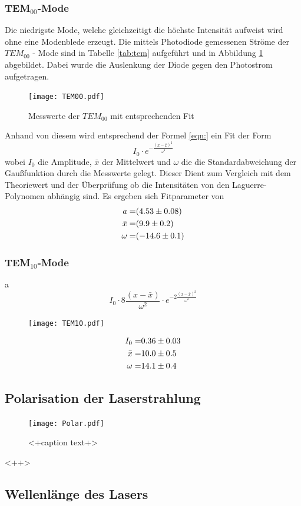 \subsubsection{TEM$_\text{00}$-Mode}
Die niedrigste Mode, welche gleichzeitigt die höchste Intensität aufweist wird ohne eine Modenblede erzeugt. Die mittels Photodiode gemessenen Ströme der $TEM_{00}$ - Mode sind in Tabelle \ref{tab:tem} aufgeführt und in Abbildung \ref{fig:TEM00} abgebildet. Dabei wurde die Auslenkung der Diode gegen den Photostrom aufgetragen.
\begin{figure}
  \centering
  \texttt{[image: TEM00.pdf]}
  \caption{Messwerte der $TEM_{00}$ mit entsprechenden Fit}
  \label{fig:TEM00}
\end{figure}

Anhand von diesem wird entsprechend der Formel \ref{eqn:} ein Fit der Form 
\begin{equation}
  I_0 \cdot e^{- \frac{(x-\bar{x})^2}{\omega^2} }
  \label{eqn:gausian}
\end{equation}
wobei $I_0$ die Amplitude, $\bar{x}$ der Mittelwert und $\omega$ die die Standardabweichung der Gaußfunktion durch die Messwerte gelegt. Dieser Dient zum Vergleich mit dem Theoriewert und der Überprüfung ob die Intensitäten von den Laguerre-Polynomen abhängig sind. Es ergeben sich Fitparameter von 
\begin{eqnarray}
  a =& (\num{4.53 +- 0.08})	\\
  \bar{x} =& (\num{9.9 +- 0.2})	\\
  \omega =& (\num{-14.6 +-0.1})	
  \label{eqn:coef}
\end{eqnarray}
\subsubsection{TEM$_\text{10}$-Mode}
a
\begin{equation}
  I_0 \cdot 8 \frac{\left( x - \bar{x} \right)}{\omega^2} \cdot e^{-2 \frac{\left( x - \bar{x} \right)^2}{\omega^2}}
  \label{eqn:TEM10}
\end{equation}

\begin{figure}
  \centering
  \texttt{[image: TEM10.pdf]}
  \caption{}
  \label{fig:<+label+>}
\end{figure}

\begin{eqnarray}
  I_0 =& \num{0.36 +- 0.03}	\\
  \bar{x} =& \num{10.0 +- 0.5} \\
  \omega =& \num{14.1 +- 0.4}
  \label{}
\end{eqnarray}

\subsection{Polarisation der Laserstrahlung}

\begin{figure}
  \centering
  \texttt{[image: Polar.pdf]}
  \caption{<+caption text+>}
  \label{fig:<+label+>}
\end{figure}<++>
\subsection{Wellenlänge des Lasers}

